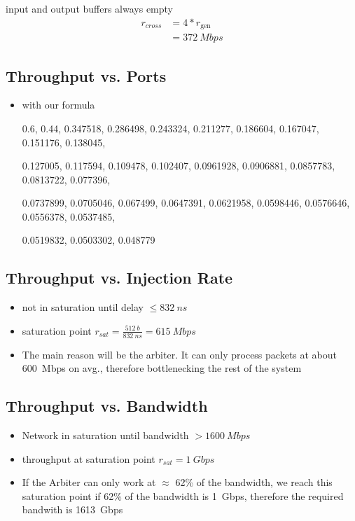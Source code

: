 \documentclass[]{scrartcl}
\begin{document}
\begin{itemize}
            input and output buffers always empty
            \begin{align}
                r_{cross} &= 4*r_\text{gen}\\
                &= \SI{372}{Mbps}
            \end{align}
    \end{itemize}
    \subsection{Throughput vs. Ports}
    \begin{itemize}
        \item with our formula
            {0.6, 0.44, 0.347518, 0.286498, 0.243324, 0.211277, 0.186604, 0.167047, 0.151176, 0.138045,

    0.127005, 0.117594, 0.109478, 0.102407, 0.0961928, 0.0906881, 0.0857783, 0.0813722, 0.077396,

    0.0737899, 0.0705046, 0.067499, 0.0647391, 0.0621958, 0.0598446, 0.0576646, 0.0556378, 0.0537485,

    0.0519832, 0.0503302, 0.048779}
    \end{itemize}
    \subsection{Throughput vs. Injection Rate}
    \begin{itemize}
        \item not in saturation until delay $\leq \SI{832}{ns}$
        \item saturation point $r_{sat} = \frac{\SI{512}{b}}{\SI{832}{ns}} = \SI{615}{Mbps}$
        \item The main reason will be the arbiter. It can only process packets at about \SI{600}{Mbps} on avg., therefore bottlenecking the rest of the system
    \end{itemize}
    \subsection{Throughput vs. Bandwidth}
    \begin{itemize}
        \item Network in saturation until bandwidth $> \SI{1600}{Mbps}$
        \item throughput at saturation point $r_{sat} = \SI{1}{Gbps}$
        \item If the Arbiter can only work at $\approx$ 62\% of the bandwidth, we reach this saturation point if 62\% of the bandwidth is \SI{1}{Gbps}, therefore the required bandwith is \SI{1613}{Gbps}
    \end{itemize}
\end{document}
